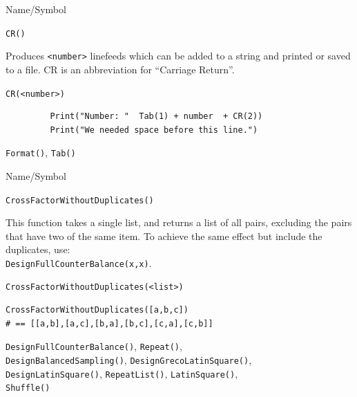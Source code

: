 \begin{desc}{Name/Symbol}

\item[Name/Symbol] \verb+CR()+

\item[Description]  Produces \verb+<number>+ linefeeds which can be added to a
  string and printed or saved to a file.  CR is an abbreviation for ``Carriage Return''.

\item[Usage]\verb!CR(<number>)!

\item[Example]     
\begin{verbatim}
         Print("Number: "  Tab(1) + number  + CR(2))
         Print("We needed space before this line.")
\end{verbatim}
\item[See Also]
\verb+Format()+, \verb+Tab()+
\end{desc}






\begin{desc}{Name/Symbol}
\item[Name/Symbol]  	\verb+CrossFactorWithoutDuplicates()+

\item[Description] 	This function takes a single list, and returns a list of all 
			pairs, excluding the pairs that have two of the same item. 
			To achieve the same effect but include the duplicates, use: \\
			\verb+DesignFullCounterBalance(x,x)+.

\item[Usage]
\begin{verbatim}
CrossFactorWithoutDuplicates(<list>)
\end{verbatim}

\item[Example]
\begin{verbatim}
CrossFactorWithoutDuplicates([a,b,c]) 
# == [[a,b],[a,c],[b,a],[b,c],[c,a],[c,b]]
\end{verbatim}

\item[See Also] \verb+DesignFullCounterBalance()+, \verb+Repeat()+,\\ \verb+DesignBalancedSampling()+,
 \verb+DesignGrecoLatinSquare()+,\\
  \verb+DesignLatinSquare()+,  \verb+RepeatList()+, 
  \verb+LatinSquare()+,\\ \verb+Shuffle()+
\end{desc}


